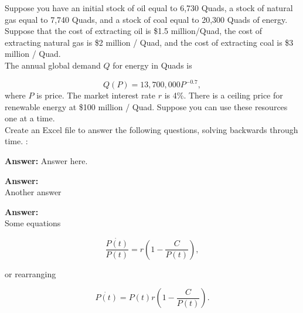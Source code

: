 \begin{enumerate}

\begin{Exercise}{Suppose you have an initial stock of oil equal to 6,730 Quads, a stock of natural gas equal to 7,740 Quads, and a stock of coal equal to 20,300 Quads of energy. Suppose that the cost of extracting oil is \$1.5 million/Quad, the cost of extracting natural gas is \$2 million / Quad, and the cost of extracting coal is \$3 million / Quad.\\

The annual global demand $Q$ for energy in Quads is 

    \begin{equation}
        Q(P) = 13,700,000P^{-0.7},
        \label{eq:demandenergy}
    \end{equation}
    where $P$ is price. The market interest rate $r$ is 4\%. There is a ceiling price for renewable energy at \$100 million / Quad. Suppose you can use these resources one at a time.\\
    
    Create an Excel file to answer the following questions, solving backwards through time.
    :}
    

    
    
     \begin{sol}
         \textbf{Answer:} Answer here.
         
     \end{sol}
    

    

      \begin{sol}
       \textbf{Answer:}\\
       Another answer
     \end{sol}
     
     
    \begin{sol}
    \textbf{Answer:}\\
    
    Some equations
    
        \begin{equation}
            \frac{\dot{P(t)}}{P(t)}=r\left(1-\frac{C}{P(t)}\right),
            \label{eq:opt-time-der}
        \end{equation}
        
    or rearranging
    
        \begin{equation*}
            \dot{P(t)}=P(t)r\left(1-\frac{C}{P(t)}\right).
        \end{equation*}
    

\end{sol}
\end{Exercise}
\end{enumerate}
